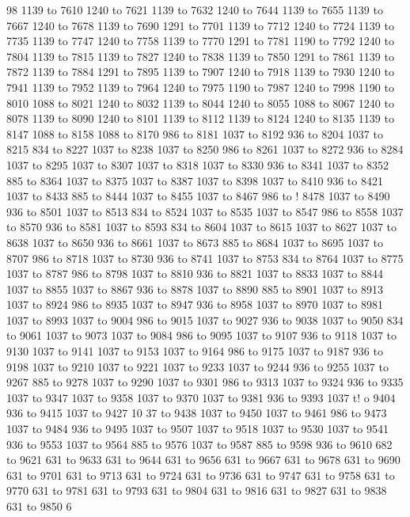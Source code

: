 98 1139 to 7610 1240 to 7621 1139 to 7632 1240 to 7644 1139 to 7655 1139 to 7667 1240 to 7678 1139 to 7690 1291 to 7701 1139 to 7712 1240 to 7724 1139 to 7735 1139 to 7747 1240 to 7758 1139 to 7770 1291 to 7781 1190 to 7792 1240 to 7804 1139 to 7815 1139 to 7827 1240 to 7838 1139 to 7850 1291 to 7861 1139 to 7872 1139 to 7884 1291 to 7895 1139 to 7907 1240 to 7918 1139 to 7930 1240 to 7941 1139 to 7952 1139 to 7964 1240 to 7975 1190 to 7987 1240 to 7998 1190 to 8010 1088 to 8021 1240 to 8032 1139 to 8044 1240 to 8055 1088 to 8067 1240 to 8078 1139 to 8090 1240 to 8101 1139 to 8112 1139 to 8124 1240 to 8135 1139 to 8147 1088 to 8158 1088 to 8170 986 to 8181 1037 to 8192 936 to 8204 1037 to 8215 834 to 8227 1037 to 8238 1037 to 8250 986 to 8261 1037 to 8272 936 to 8284 1037 to 8295 1037 to 8307 1037 to 8318 1037 to 8330 936 to 8341 1037 to 8352 885 to 8364 1037 to 8375 1037 to 8387 1037 to 8398 1037 to 8410 936 to 8421 1037 to 8433 885 to 8444 1037 to 8455 1037 to 8467 986 to !
8478 1037 to 8490 936 to 8501 1037
 to 8513 834 to 8524 1037 to 8535 1037 to 8547 986 to 8558 1037 to 8570 936 to 8581 1037 to 8593 834 to 8604 1037 to 8615 1037 to 8627 1037 to 8638 1037 to 8650 936 to 8661 1037 to 8673 885 to 8684 1037 to 8695 1037 to 8707 986 to 8718 1037 to 8730 936 to 8741 1037 to 8753 834 to 8764 1037 to 8775 1037 to 8787 986 to 8798 1037 to 8810 936 to 8821 1037 to 8833 1037 to 8844 1037 to 8855 1037 to 8867 936 to 8878 1037 to 8890 885 to 8901 1037 to 8913 1037 to 8924 986 to 8935 1037 to 8947 936 to 8958 1037 to 8970 1037 to 8981 1037 to 8993 1037 to 9004 986 to 9015 1037 to 9027 936 to 9038 1037 to 9050 834 to 9061 1037 to 9073 1037 to 9084 986 to 9095 1037 to 9107 936 to 9118 1037 to 9130 1037 to 9141 1037 to 9153 1037 to 9164 986 to 9175 1037 to 9187 936 to 9198 1037 to 9210 1037 to 9221 1037 to 9233 1037 to 9244 936 to 9255 1037 to 9267 885 to 9278 1037 to 9290 1037 to 9301 986 to 9313 1037 to 9324 936 to 9335 1037 to 9347 1037 to 9358 1037 to 9370 1037 to 9381 936 to 9393 1037 t!
o 9404 936 to 9415 1037 to 9427 10
37 to 9438 1037 to 9450 1037 to 9461 986 to 9473 1037 to 9484 936 to 9495 1037 to 9507 1037 to 9518 1037 to 9530 1037 to 9541 936 to 9553 1037 to 9564 885 to 9576 1037 to 9587 885 to 9598 936 to 9610 682 to 9621 631 to 9633 631 to 9644 631 to 9656 631 to 9667 631 to 9678 631 to 9690 631 to 9701 631 to 9713 631 to 9724 631 to 9736 631 to 9747 631 to 9758 631 to 9770 631 to 9781 631 to 9793 631 to 9804 631 to 9816 631 to 9827 631 to 9838 631 to 9850 6
